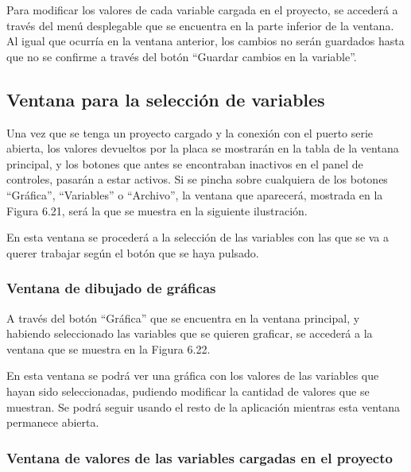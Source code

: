 Para modificar los valores de cada variable cargada en el proyecto, se accederá a través del menú desplegable que se encuentra en la parte inferior de la ventana. Al igual que ocurría en la ventana anterior, los cambios no serán guardados hasta que  no se confirme a través del botón ``Guardar cambios en la variable''.


\subsection{Ventana para la selección de variables}

Una vez que se tenga un proyecto cargado y la conexión con el puerto serie abierta, los valores devueltos por la placa se mostrarán en la tabla de la ventana principal, y los botones que antes se encontraban inactivos en el panel de controles, pasarán a estar activos. Si se pincha sobre cualquiera de los botones ``Gráfica'', ``Variables'' o ``Archivo'', la ventana que aparecerá, mostrada en la Figura 6.21, será la que se muestra en la siguiente ilustración.


En esta ventana se procederá a la selección de las variables con las que se va a querer trabajar según el botón que se haya pulsado. 

\subsubsection{Ventana de dibujado de gráficas}

A través del botón ``Gráfica'' que se encuentra en la ventana principal, y habiendo seleccionado las variables que se quieren graficar, se accederá a la ventana que se muestra en la Figura 6.22.


En esta ventana se podrá ver una gráfica con los valores de las variables que hayan sido seleccionadas, pudiendo modificar la cantidad de valores que se muestran. Se podrá seguir usando el resto de la aplicación mientras esta ventana permanece abierta.

\subsubsection{Ventana de valores de las variables cargadas en el proyecto}

